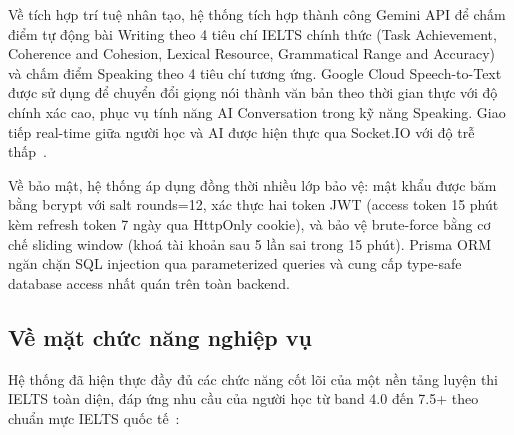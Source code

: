 \documentclass[a4paper,12pt]{extreport}
\begin{document}
Về tích hợp trí tuệ nhân tạo, hệ thống tích hợp thành công Gemini API để chấm điểm tự động bài Writing theo 4 tiêu chí IELTS chính thức (Task Achievement, Coherence and Cohesion, Lexical Resource, Grammatical Range and Accuracy) và chấm điểm Speaking theo 4 tiêu chí tương ứng. Google Cloud Speech-to-Text~\cite{gcp-stt} được sử dụng để chuyển đổi giọng nói thành văn bản theo thời gian thực với độ chính xác cao, phục vụ tính năng AI Conversation trong kỹ năng Speaking. Giao tiếp real-time giữa người học và AI được hiện thực qua Socket.IO với độ trễ thấp~\cite{socketio-docs}.

Về bảo mật, hệ thống áp dụng đồng thời nhiều lớp bảo vệ: mật khẩu được băm bằng bcrypt với salt rounds=12, xác thực hai token JWT (access token 15 phút kèm refresh token 7 ngày qua HttpOnly cookie), và bảo vệ brute-force bằng cơ chế sliding window (khoá tài khoản sau 5 lần sai trong 15 phút). Prisma ORM~\cite{prisma-docs} ngăn chặn SQL injection qua parameterized queries và cung cấp type-safe database access nhất quán trên toàn backend.

\subsection{Về mặt chức năng nghiệp vụ}

Hệ thống đã hiện thực đầy đủ các chức năng cốt lõi của một nền tảng luyện thi IELTS toàn diện, đáp ứng nhu cầu của người học từ band 4.0 đến 7.5+ theo chuẩn mực IELTS quốc tế~\cite{ielts-global-stats}:
\end{document}
